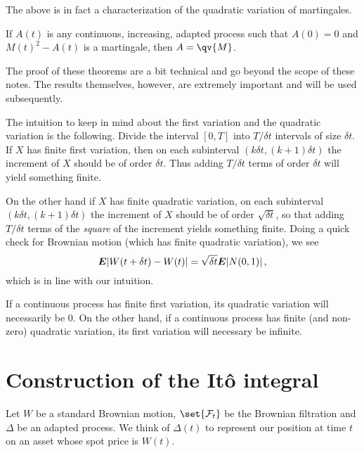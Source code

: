 The above is in fact a characterization of the quadratic variation of martingales.

\begin{theorem}\label{t:3qv2}
  If $A(t)$ is any continuous, increasing, adapted process such that $A(0) = 0$ and $M(t)^2 - A(t)$ is a martingale, then $A = \qv{M}$.
\end{theorem}

The proof of these theorems are a bit technical and go beyond the scope of these notes.
The results themselves, however, are extremely important and will be used subsequently.

\begin{remark}
  The intuition to keep in mind about the first variation and the quadratic variation is the following.
  Divide the interval $[0, T]$ into $T/\delta t$ intervals of size $\delta t$.
  If $X$ has finite first variation, then on each subinterval $(k \delta t, (k+1) \delta t)$ the increment of $X$ should be of order $\delta t$.
  Thus adding $T / \delta t$ terms of order $\delta t$ will yield something finite.

  On the other hand if $X$ has finite quadratic variation, on each subinterval $(k \delta t, (k+1) \delta t)$ the increment of $X$ should be of order $\sqrt{\delta t}$, so that adding $T / \delta t$ terms of the \emph{square} of the increment yields something finite.
  Doing a quick check for Brownian motion (which has finite quadratic variation), we see
  \begin{equation*}
    \bm{E} \lvert W(t + \delta t) - W(t)\rvert = \sqrt{\delta t} \bm{E} \lvert N(0, 1)\rvert\,,
  \end{equation*}
  which is in line with our intuition.
\end{remark}

\begin{remark}
  If a continuous process has finite first variation, its quadratic variation will necessarily be $0$.
  On the other hand, if a continuous process has finite (and non-zero) quadratic variation, its first variation will necessary be infinite.
\end{remark}


\section{Construction of the It\^o integral}

Let $W$ be a standard Brownian motion, $\set{\mathcal F_t}$ be the Brownian filtration and $\Delta$ be an adapted process.
We think of $\Delta(t)$ to represent our position at time $t$ on an asset whose spot price is $W(t)$.

